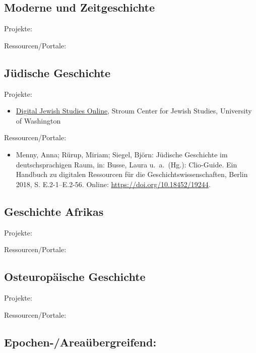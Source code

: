 \documentclass[
  letterpaper,
]{book}
\providecommand{\tightlist}{%
  \setlength{\itemsep}{0pt}\setlength{\parskip}{0pt}}\usepackage{longtable,booktabs,array}
\begin{document}
\hypertarget{moderne-und-zeitgeschichte}{%
\subsection{Moderne und
Zeitgeschichte}\label{moderne-und-zeitgeschichte}}

Projekte:

Ressourcen/Portale:

\hypertarget{juxfcdische-geschichte}{%
\subsection{Jüdische Geschichte}\label{juxfcdische-geschichte}}

Projekte:

\begin{itemize}
\tightlist
\item
  \href{https://jewishstudies.washington.edu/digital-jewish-studies/}{Digital
  Jewish Studies Online}, Stroum Center for Jewish Studies, University
  of Washington
\end{itemize}

Ressourcen/Portale:

\begin{itemize}
\tightlist
\item
  Menny, Anna; Rürup, Miriam; Siegel, Björn: Jüdische Geschichte im
  deutschsprachigen Raum, in: Busse, Laura u.~a.~(Hg.): Clio-Guide. Ein
  Handbuch zu digitalen Ressourcen für die Geschichtswissenschaften,
  Berlin 2018, S. E.2-1--E.2-56. Online:
  \url{https://doi.org/10.18452/19244}.
\end{itemize}

\hypertarget{geschichte-afrikas}{%
\subsection{Geschichte Afrikas}\label{geschichte-afrikas}}

Projekte:

Ressourcen/Portale:

\hypertarget{osteuropuxe4ische-geschichte}{%
\subsection{Osteuropäische
Geschichte}\label{osteuropuxe4ische-geschichte}}

Projekte:

Ressourcen/Portale:

\hypertarget{epochen-areauxfcbergreifend}{%
\subsection{Epochen-/Areaübergreifend:}\label{epochen-areauxfcbergreifend}}
\end{document}
